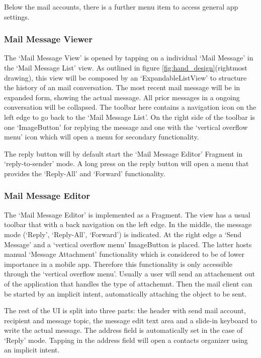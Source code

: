 \documentclass[a4paper,11pt,twoside]{article}
\begin{document}
Below the mail accounts, there is a further menu item to access general app
settings.

\subsubsection{Mail Message Viewer}
The `Mail Message View' is opened by tapping on a individual `Mail Message' in
the `Mail Message List' view. As outlined in figure
\ref{fig:hand_design}(rightmost drawing), this view will be composed by an
`ExpandableListView' to structure the history of an mail conversation. The most
recent mail message will be in expanded form, showing the actual message. All
prior messages in a ongoing conversation will be collapsed. The toolbar here
contains a navigation icon on the left edge to go back to the `Mail Message
List'. On the right side of the toolbar is one `ImageButton' for replying the
message and one with the `vertical overflow menu' icon which will open a menu
for secondary functionality.

The reply button will by default start the `Mail Message Editor' Fragment in
`reply-to-sender' mode. A long press on the reply button will open a menu that
provides the `Reply-All' and `Forward' functionality.


\subsubsection{Mail Message Editor}
The `Mail Message Editor' is implemented as a Fragment. The view has a usual
toolbar that with a back navigation on the left edge. In the middle, the message
mode (`Reply', `Reply-All', `Forward') is indicated. At the right edge a `Send
Message' and a `vertical overflow menu' ImageButton is placed. The latter hosts
manual `Message Attachment' functionality which is considered to be of lower importance
in a mobile app. Therefore this functionality is only accessible through the
`vertical overflow menu'. Usually a user will send an attachement out of the
application that handles the type of attachemnt. Then the mail client can be
started by an implicit intent, automatically attaching the object to be sent.

The rest of the UI is split  into three parts: the  header with send mail
account, recipient and message topic, the message edit text area and a slide-in
keyboard to write the actual message. The address field is automatically set
in the case of `Reply' mode. Tapping in the address field will open a contacts
organizer using an implicit intent.
\end{document}
